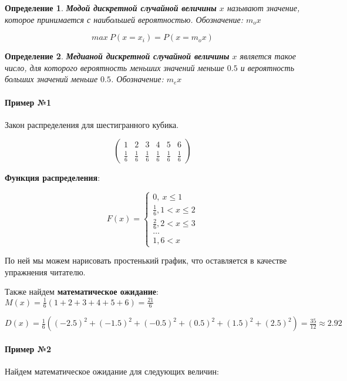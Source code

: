 \documentclass{article}
\newtheorem{definition}{Определение}
\begin{document}
\begin{definition}
    \textbf{Модой дискретной случайной величины} $x$ называют значение, которое принимается с наибольшей вероятностью. Обозначение: $m_o x$

    $$max \ P(x = x_i) = P(x = m_o x)$$
\end{definition}

\begin{definition}
    \textbf{Медианой дискретной случайной величины} $x$ является такое число, для которого вероятность меньших значений меньше $0.5$ и вероятность больших значений меньше $0.5$. Обозначение: $m_{e} x$
\end{definition}


\paragraph{Пример №1}

Закон распределения для шестигранного кубика.

$$
\begin{pmatrix}
  1 & 2 & 3 & 4 & 5 & 6 \\
  \frac{1}{6} & \frac{1}{6} & \frac{1}{6} & \frac{1}{6} & \frac{1}{6} & \frac{1}{6}
\end{pmatrix}
$$

\textbf{Функция распределения}:

$$F(x) = \begin{cases}
    0, \ x \le 1 \\
    \frac{1}{6}, 1 < x \le 2 \\
    \frac{2}{6}, 2 < x \le 3 \\
    \dots \\
    1, 6 < x
\end{cases}
$$

По ней мы можем нарисовать простенький график, что оставляется в качестве упражнения читателю.

Также найдем \textbf{математическое ожидание}: $M(x) = \frac{1}{6} (1 + 2 + 3 + 4 + 5 + 6) = \frac{21}{6}$

$D(x) = \frac{1}{6} ((-2.5)^2 + (-1.5)^2 + (-0.5)^2 + (0.5)^2 + (1.5)^2 + (2.5)^2) = \frac{35}{12} \approx 2.92$

\paragraph{Пример №2}

Найдем математическое ожидание для следующих величин:
\end{document}
